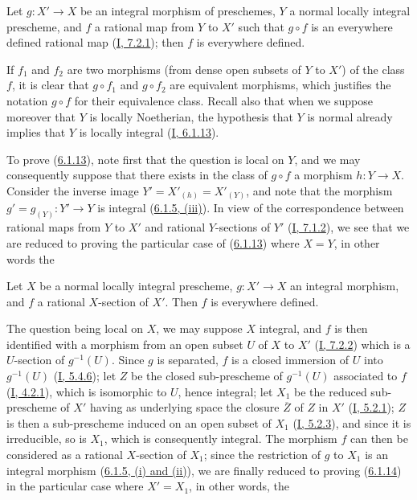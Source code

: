 \begin{proposition}[6.1.13]
\label{II.6.1.13}
Let $g:X'\to X$ be an integral morphism of preschemes, $Y$ a normal locally
integral prescheme, and $f$ a rational map from $Y$ to $X'$ such that
$g\circ f$ is an everywhere defined rational map
(\hyperref[I.7.2.1]{I, 7.2.1}); then $f$ is everywhere defined.
\end{proposition}

If $f_1$ and $f_2$ are two morphisms (from dense open subsets of $Y$ to
$X'$) of the class $f$, it is clear that $g\circ f_1$ and $g\circ f_2$ are
equivalent morphisms, which justifies the notation $g\circ f$ for their
equivalence class. Recall also that when we suppose moreover that $Y$ is
locally Noetherian, the hypothesis that $Y$ is normal already implies that
$Y$ is locally integral (\hyperref[I.6.1.13]{I, 6.1.13}).

To prove (\hyperref[II.6.1.13]{6.1.13}), note first that the question is
local on $Y$, and we may consequently suppose that there exists in the class
of $g\circ f$ a morphism $h:Y\to X$. Consider the inverse image
$Y'=X'_{(h)}=X'_{(Y)}$, and note that the morphism
$g'=g_{(Y)}:Y'\to Y$ is integral
(\hyperref[II.6.1.5]{6.1.5, (iii)}). In view of the correspondence between
rational maps from $Y$ to $X'$ and rational $Y$-sections of $Y'$
(\hyperref[I.7.1.2]{I, 7.1.2}), we see that we are reduced to proving the
particular case of (\hyperref[II.6.1.13]{6.1.13}) where $X=Y$, in other
words the

\begin{corollary}[6.1.14]
\label{II.6.1.14}
Let $X$ be a normal locally integral prescheme, $g:X'\to X$ an integral
morphism, and $f$ a rational $X$-section of $X'$. Then $f$ is everywhere
defined.
\end{corollary}

The question being local on $X$, we may suppose $X$ integral, and $f$ is then
identified with a morphism from an open subset $U$ of $X$ to $X'$
(\hyperref[I.7.2.2]{I, 7.2.2}) which is a $U$-section of $g^{-1}(U)$.
Since $g$ is separated, $f$ is a closed immersion of $U$ into $g^{-1}(U)$
(\hyperref[I.5.4.6]{I, 5.4.6}); let $Z$ be the closed sub-prescheme of
$g^{-1}(U)$ associated to $f$ (\hyperref[I.4.2.1]{I, 4.2.1}), which is
isomorphic to $U$, hence integral; let $X_1$ be the reduced sub-prescheme of
$X'$ having as underlying space the closure $\overline{Z}$ of $Z$ in $X'$
(\hyperref[I.5.2.1]{I, 5.2.1}); $Z$ is then a sub-prescheme induced on an
open subset of $X_1$ (\hyperref[I.5.2.3]{I, 5.2.3}), and since it is
irreducible, so is $X_1$, which is consequently integral. The morphism $f$
can then be considered as a rational $X$-section of $X_1$; since the
restriction of $g$ to $X_1$ is an integral morphism
(\hyperref[II.6.1.5]{6.1.5, (i) and (ii)}), we are finally reduced to
proving (\hyperref[II.6.1.14]{6.1.14}) in the particular case where
$X'=X_1$, in other words, the

